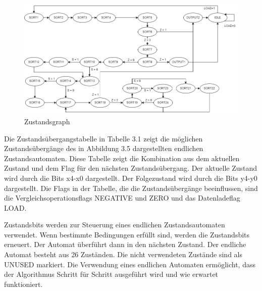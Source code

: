 \begin{figure}[H]
  \centering
  \includegraphics[width=1.0\textwidth]{images/Zustandsgraph.png}
  \caption[Zustandsgraph]{Zustandsgraph}
  \label{fig:Zustandsgraph}
\end{figure}

\noindent Die Zustandsübergangstabelle in Tabelle 3.1 zeigt die möglichen Zustandsübergänge des in Abbildung 3.5 dargestellten endlichen Zustandsautomaten. Diese Tabelle zeigt die Kombination aus dem aktuellen Zustand und dem Flag für den nächsten Zustandsübergang. Der aktuelle Zustand wird durch die Bits x4-x0 dargestellt. Der Folgezustand wird durch die Bits y4-y0 dargestellt. Die Flags in der Tabelle, die die Zustandsübergänge beeinflussen, sind die Vergleichsoperationsflags NEGATIVE und ZERO und das Datenladeflag LOAD.

\noindent Zustandsbits werden zur Steuerung eines endlichen Zustandsautomaten verwendet. Wenn bestimmte Bedingungen erfüllt sind, werden die Zustandsbits erneuert. Der Automat überführt dann in den nächsten Zustand. Der endliche Automat besteht aus 26 Zuständen. Die nicht verwendeten Zustände sind als UNUSED markiert. Die Verwendung eines endlichen Automaten ermöglicht, dass der Algorithmus Schritt für Schritt ausgeführt wird und wie erwartet funktioniert.


